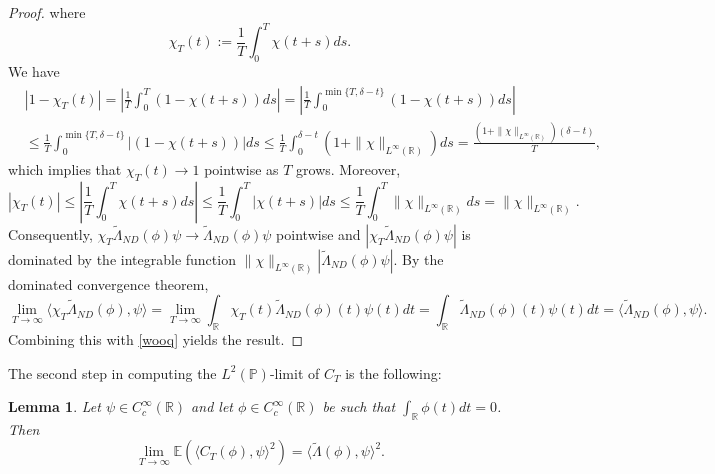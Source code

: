 \documentclass[10pt,a4paper]{article}
\theoremstyle{plain}
\newtheorem{lemma}[theorem]{Lemma}
\theoremstyle{definition}
\theoremstyle{remark}
\numberwithin{equation}{section}
\newcommand{\R}{\mathbb{R}}
\newcommand{\E}{\mathbb{E}} %
\begin{document}
\begin{proof}
where 
\[
\chi_T(t) :=   \frac{1}{T}  \int_0^T   \chi  (t+s)  ds  .
\]
We have 
\begin{align}
&|1- \chi_T(t)  | 
= \left| \frac{1}{T} \int_0^T (1-\chi(t+s))  ds   \right|
=
 \left| \frac{1}{T} \int_0^{\min\{T,\delta-t\}} (1-\chi(t+s))  ds   \right|
 \\
& \leq 
 \frac{1}{T} \int_0^{\min\{T,\delta-t\}}  \left| (1-\chi(t+s))    \right|ds
 \leq
  \frac{1}{T} \int_0^{\delta-t}  (1+\|\chi\|_{L^\infty(\R)}) ds 
  =  
  \frac{ (1+\|\chi\|_{L^\infty(\R)}) (\delta - t)}{T},
\end{align}
which implies that $\chi_T(t) \to 1$ pointwise as $T$ grows.  Moreover, 
\[
| \chi_T(t) |  \leq  \left| \frac{1}{T} \int_0^T \chi(t+s)   ds  \right|  \leq   \frac{1}{T} \int_0^T \left| \chi(t+s)     \right|ds
\leq   \frac{1}{T} \int_0^T   \| \chi \|_{L^\infty(\R)} ds  = \| \chi \|_{L^\infty(\R)}.
\]
Consequently,
$
 \chi_T  \tilde\Lambda_{ND} (\phi  )   \psi   \to \tilde\Lambda_{ND} (\phi  )   \psi  
$ 
pointwise and $| \chi_T  \tilde\Lambda_{ND} (\phi  )   \psi |$ is dominated by the integrable function $ \| \chi \|_{L^\infty(\R)} | \tilde\Lambda_{ND} (\phi  )   \psi| $.
By the dominated convergence theorem,  
\[
\lim_{T \to \infty}\langle   \chi_T  \tilde\Lambda_{ND} (\phi  ) ,   \psi   \rangle
=
\lim_{T \to \infty} \int_{\R}   \chi_T(t)  \tilde\Lambda_{ND} (\phi  )(t)    \psi(t) dt
=
\int_{\R}  \tilde\Lambda_{ND} (\phi  )(t)    \psi(t) dt
=
 \langle    \tilde\Lambda_{ND} (\phi  ) ,   \psi   \rangle .
\]
Combining this with \eqref{wooq} yields the result.
\end{proof}

The second step in computing the $L^2(\mathbb{P})$-limit of $C_T$ is the following:

\begin{lemma}\label{E-lemma}
Let  $\psi \in C^\infty_c(\R)$ and let $\phi \in C^\infty_c( \R)$ be such that $\int_{\R} \phi(t)dt  = 0$. 
Then 
\[
\lim_{T \to \infty}  \E \left(  \langle C_T (\phi ),   \psi  \rangle^2 \right)= \langle \tilde\Lambda (\phi) ,\psi \rangle^2 .
\] 
\end{lemma}  
\end{document}
